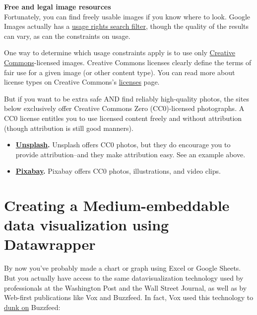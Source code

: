 \documentclass[]{book}
\providecommand{\tightlist}{%
  \setlength{\itemsep}{0pt}\setlength{\parskip}{0pt}}
\theoremstyle{definition}
\theoremstyle{definition}
\theoremstyle{definition}
\theoremstyle{remark}
\begin{document}
\textbf{Free and legal image resources}\\
Fortunately, you can find freely usable images if you know where to
look. Google Images actually has a
\href{https://support.google.com/websearch/answer/29508?hl=en}{usage
rights search filter}, though the quality of the results can vary, as
can the constraints on usage.

One way to determine which usage constraints apply is to use only
\href{https://search.creativecommons.org/}{Creative Commons}-licensed
images. Creative Commons licenses clearly define the terms of fair use
for a given image (or other content type). You can read more about
license types on Creative Commons's
\href{https://creativecommons.org/licenses/}{licenses} page.

But if you want to be extra safe AND find reliably high-quality photos,
the sites below exclusively offer Creative Commons Zero (CC0)-licensed
photographs. A CC0 license entitles you to use licensed content freely
and without attribution (though attribution is still good manners).

\begin{itemize}
\tightlist
\item
  \textbf{\href{https://unsplash.com/}{Unsplash}.} Unsplash offers CC0
  photos, but they do encourage you to provide attribution--and they
  make attribution easy. See an example above.
\item
  \textbf{\href{https://pixabay.com/}{Pixabay}.} Pixabay offers CC0
  photos, illustrations, and video clips.
\end{itemize}

\hypertarget{creating-a-medium-embeddable-data-visualization-using-datawrapper}{%
\section{Creating a Medium-embeddable data visualization using
Datawrapper}\label{creating-a-medium-embeddable-data-visualization-using-datawrapper}}

By now you've probably made a chart or graph using Excel or Google
Sheets. But you actually have access to the same datavisualization
technology used by professionals at the Washington Post and the Wall
Street Journal, as well as by Web-first publications like Vox and
Buzzfeed. In fact, Vox used this technology to
\href{https://www.vox.com/2017/11/30/16709310/buzzfeed-losing-web-traffic-readers-layoffs-uniques-prefer-news-over-viral-sites}{dunk
on} Buzzfeed:
\end{document}
